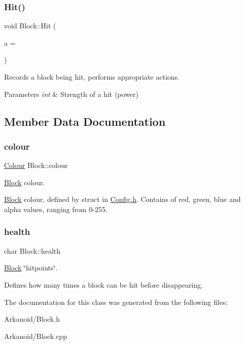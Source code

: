 \subsubsection{\texorpdfstring{Hit()}{Hit()}}
{\footnotesize\ttfamily void Block\+::\+Hit (\begin{DoxyParamCaption}\item[{int}]{a = {} }\end{DoxyParamCaption})}



Records a block being hit, performs appropriate actions. 


\begin{DoxyParams}{Parameters}
{\em int} & Strength of a hit (power) \\
\hline
\end{DoxyParams}


\subsection{Member Data Documentation}
\mbox{\label{class_block_acb5551f2233e2a97b9d9e7ab40590e33}} 
\subsubsection{\texorpdfstring{colour}{colour}}
{\footnotesize\ttfamily \hyperlink{struct_colour}{Colour} Block\+::colour}



\hyperlink{class_block}{Block} colour. 

\hyperlink{class_block}{Block} colour, defined by struct in \hyperlink{_config_8h_source}{Config.\+h}. Contains of red, green, blue and alpha values, ranging from 0-\/255. \mbox{\label{class_block_a5e2a1909ae2f2572cd75b2c38d3abddb}} 
\subsubsection{\texorpdfstring{health}{health}}
{\footnotesize\ttfamily char Block\+::health}



\hyperlink{class_block}{Block} \char`\"{}hitpoints\char`\"{}. 

Defines how many times a block can be hit before disappearing. 

The documentation for this class was generated from the following files\+:\begin{DoxyCompactItemize}
\item 
Arkanoid/Block.\+h\item 
Arkanoid/Block.\+cpp\end{DoxyCompactItemize}
